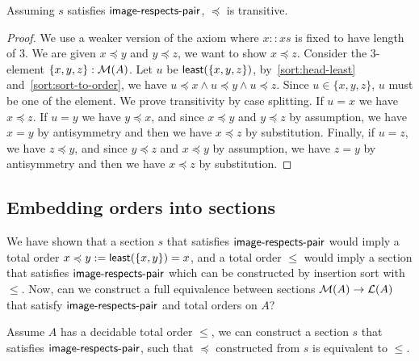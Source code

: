 \begin{proposition}
    Assuming $s$ satisfies $\operatorname{\mathsf{image-respects-pair}}$, $\preccurlyeq$ is transitive.
\end{proposition}
\begin{proof}
    We use a weaker version of the axiom where $x :: xs$ is fixed to have length of 3.
    We are given $x \preccurlyeq y$ and $y \preccurlyeq z$, we want to show $x \preccurlyeq z$.
    Consider the 3-element $\{x,y,z\} : \mathcal{M}(A)$. Let $u$ be $\operatorname{\mathsf{least}}(\{x,y,z\})$,
    by~\cref{sort:head-least} and~\cref{sort:sort-to-order},
    we have $u \preccurlyeq x \land u \preccurlyeq y \land u \preccurlyeq z$.
    Since $u \in \{x,y,z\}$, $u$ must be one of the element. We prove transitivity by case splitting.
    If $u = x$ we have $x \preccurlyeq z$. If $u = y$ we have $y \preccurlyeq x$, and since
    $x \preccurlyeq y$ and $y \preccurlyeq z$ by assumption,
    we have $x = y$ by antisymmetry and then we have $x \preccurlyeq z$ by substitution.
    Finally, if $u = z$, we have $z \preccurlyeq y$, and since
    $y \preccurlyeq z$ and $x \preccurlyeq y$ by assumption,
    we have $z = y$ by antisymmetry and then we have $x \preccurlyeq z$ by substitution.
\end{proof}

\subsection{Embedding orders into sections}

We have shown that a section $s$ that satisfies $\operatorname{\mathsf{image-respects-pair}}$ would imply a total order
$x \preccurlyeq y := \operatorname{\mathsf{least}}(\{x, y\}) = x$,
and a total order $\leq$ would imply a section that satisfies $\operatorname{\mathsf{image-respects-pair}}$ which can
be constructed by insertion sort with $\leq$. Now, can we construct a full equivalence
between sections $\mathcal{M}(A) \to \mathcal{L}(A)$ that satisfy $\operatorname{\mathsf{image-respects-pair}}$ and total orders on $A$?

\begin{proposition}\label{sort:o2s2o}
    Assume $A$ has a decidable total order $\leq$, we can construct a section $s$ that
    satisfies $\operatorname{\mathsf{image-respects-pair}}$, such that $\preccurlyeq$ constructed from $s$ is equivalent
    to $\leq$.
\end{proposition}

